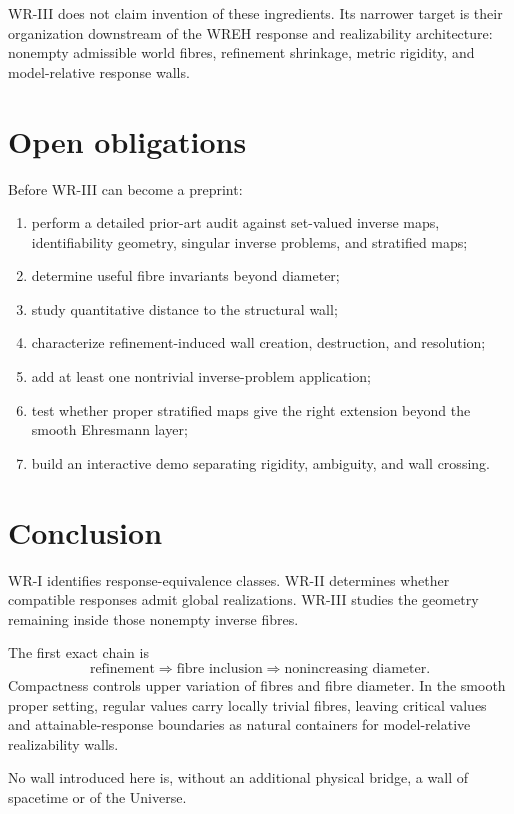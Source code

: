 \documentclass[11pt]{article}
\begin{document}
WR-III does not claim invention of these ingredients. Its narrower target is
their organization downstream of the WREH response and realizability
architecture: nonempty admissible world fibres, refinement shrinkage, metric
rigidity, and model-relative response walls.

\section{Open obligations}

Before WR-III can become a preprint:

\begin{enumerate}
\item perform a detailed prior-art audit against set-valued inverse maps,
identifiability geometry, singular inverse problems, and stratified maps;
\item determine useful fibre invariants beyond diameter;
\item study quantitative distance to the structural wall;
\item characterize refinement-induced wall creation, destruction, and
resolution;
\item add at least one nontrivial inverse-problem application;
\item test whether proper stratified maps give the right extension beyond the
smooth Ehresmann layer;
\item build an interactive demo separating rigidity, ambiguity, and wall
crossing.
\end{enumerate}

\section*{Conclusion}

WR-I identifies response-equivalence classes. WR-II determines whether
compatible responses admit global realizations. WR-III studies the geometry
remaining inside those nonempty inverse fibres.

The first exact chain is
\[
\text{refinement}
\Longrightarrow
\text{fibre inclusion}
\Longrightarrow
\text{nonincreasing diameter}.
\]
Compactness controls upper variation of fibres and fibre diameter. In the
smooth proper setting, regular values carry locally trivial fibres, leaving
critical values and attainable-response boundaries as natural containers for
model-relative realizability walls.

No wall introduced here is, without an additional physical bridge, a wall of
spacetime or of the Universe.
\end{document}
